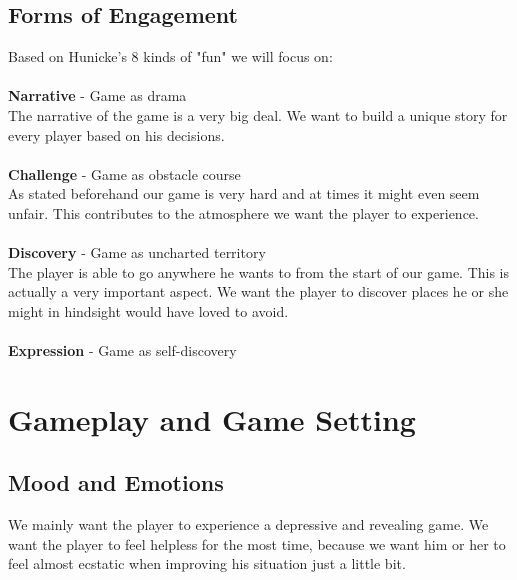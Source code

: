 \documentclass[a4paper]{scrreprt}
\begin{document}
\section{Forms of Engagement}
Based on Hunicke's 8 kinds of "fun" we will focus on:\\
\\
\textbf{Narrative} - Game as drama\\
The narrative of the game is a very big deal. We want to build a unique story for every player based on his decisions.\\ 
\\
\textbf{Challenge} - Game as obstacle course\\
As stated beforehand our game is very hard and at times it might even seem unfair. This contributes to the atmosphere we want the player to experience.\\
\\
\textbf{Discovery} - Game as uncharted territory\\
The player is able to go anywhere he wants to from the start of our game. This is actually a very important aspect. We want the player to discover places he or she might in hindsight would have loved to avoid.\\
\\
\textbf{Expression} - Game as self-discovery\\



\chapter{Gameplay and Game Setting}

\section{Mood and Emotions}
We mainly want the player to experience a depressive and revealing game. We want the player to feel helpless for the most time, because we want him or her to feel almost ecstatic when improving his situation just a little bit. 
\end{document}
